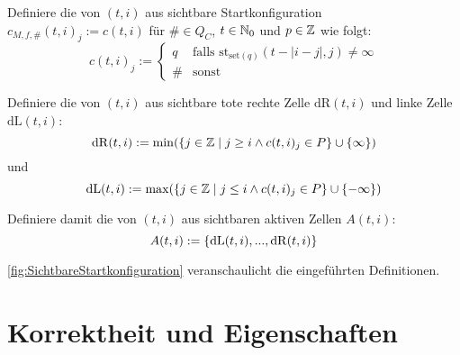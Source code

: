 \begin{definition}
\begin{figure}[h!]
    \end{figure}
    
    Definiere die von $(t, i)$ aus sichtbare Startkonfiguration $c_{M, f, \#}(t, i)_j := c(t, i)$
    für $\# \in Q_C$, $t \in \mathbb{N}_0$ und $p \in \mathbb{Z}$ wie folgt:
    \[
        c(t, i)_j :=
        \begin{cases}
            q & 
                \text{falls } \mathrm{st}_{\mathrm{set}(q)}(t - |i-j|, j) \neq \infty
             \\
            \# & \text{sonst}
        \end{cases}
    \]
    
    Definiere die von $(t, i)$ aus sichtbare tote rechte Zelle $\mathrm{dR}(t, i)$ und linke Zelle $\mathrm{dL}(t, i)$:
    \[
        \mathrm{dR}(t, i) := \min (\{ { j \in \mathbb{Z}} \; | \; {j \geq i \land c(t, i)_j \in P} \} \cup \{ { \infty } \})
    \]
    und
    \[
        \mathrm{dL}(t, i) := \max (\{ { j \in \mathbb{Z}} \; | \; {j \leq i \land c(t, i)_j \in P} \} \cup \{ { -\infty } \})
    \]
    
    Definiere damit die von $(t, i)$ aus sichtbaren aktiven Zellen $A(t, i)$:
    \[
        A(t, i) := \{ { \mathrm{dL}(t, i), ..., \mathrm{dR}(t, i)} \}
    \]
    
    \cref{fig:SichtbareStartkonfiguration} veranschaulicht die eingeführten Definitionen.
\end{definition}

\section{Korrektheit und Eigenschaften}

